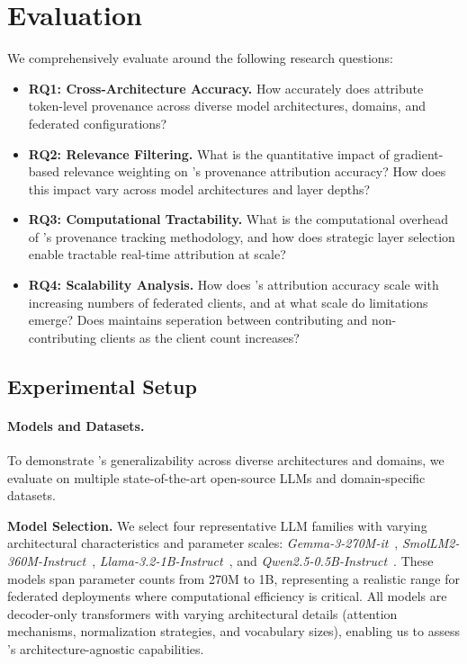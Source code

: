 \section{Evaluation}

We comprehensively evaluate \tool around the following research questions:

\begin{itemize}
  \item \textbf{RQ1: Cross-Architecture Accuracy.} How accurately does \tool attribute token-level provenance across diverse model architectures, domains, and federated configurations?

  \item \textbf{RQ2: Relevance Filtering.} What is the quantitative impact of gradient-based relevance weighting on \tool's provenance attribution accuracy?  How does this impact vary across model architectures and layer depths? 
  
  \item \textbf{RQ3: Computational Tractability.} What is the computational overhead of \tool's provenance tracking methodology, and how does strategic layer selection enable tractable real-time attribution at scale?

  \item \textbf{RQ4: Scalability Analysis.} How does \tool's attribution accuracy scale with increasing numbers of federated clients, and at what scale do limitations emerge? Does \tool maintains seperation between contributing and non-contributing clients as the client count increases?

\end{itemize}

\subsection{Experimental Setup}

\paragraph{Models and Datasets.}
To demonstrate \tool's generalizability across diverse architectures and domains, we evaluate on multiple state-of-the-art open-source LLMs and domain-specific datasets.

\textbf{Model Selection.}
We select four representative LLM families with varying architectural characteristics and parameter scales: \textit{Gemma-3-270M-it}~\cite{gemma}, \textit{SmolLM2-360M-Instruct}~\cite{smollm}, \textit{Llama-3.2-1B-Instruct}~\cite{llama}, and \textit{Qwen2.5-0.5B-Instruct}~\cite{qwen}.
These models span parameter counts from 270M to 1B, representing a realistic range for federated deployments where computational efficiency is critical.
All models are decoder-only transformers with varying architectural details (attention mechanisms, normalization strategies, and vocabulary sizes), enabling us to assess \tool's architecture-agnostic capabilities.

